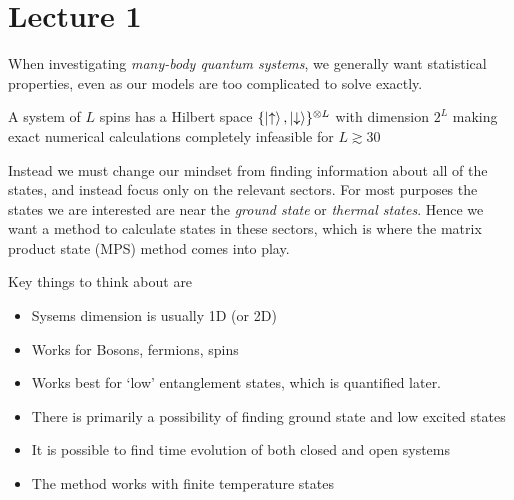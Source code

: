 \documentclass[a4paper]{article}
\author{Oscar Emil Sommer}
\begin{document}
\section{Lecture 1}
When investigating \emph{many-body quantum systems}, we generally want statistical properties,
even as our models are too complicated to solve exactly.

\begin{example}
    A system of $L$ spins has a Hilbert space
    $\{\ket{\uparrow},\ket{\downarrow}\}^{\otimes L} $ 
    with  dimension $2^L$ making exact
    numerical calculations completely infeasible for $L\gtrsim 30$
    \begin{center}
    \end{center}
    
\end{example}
Instead we must change our mindset from finding information about all of the
states, and instead focus only on the relevant sectors. For most purposes the
states we are interested are near the \emph{ground state} or \emph{thermal
states}.  Hence we want a method to calculate states in these sectors, which is
where the matrix product state (MPS) method comes into play.\\
\begin{remark} Key things to think about are
    \mbox{}
\begin{itemize}
    \item Sysems dimension is usually 1D (or 2D)
    \item Works for Bosons, fermions, spins
    \item Works best for `low' entanglement states, which is quantified later.
    \item There is primarily a possibility of finding ground state and low excited states
    \item It is possible to find time evolution of both closed and open systems
    \item The method works with finite temperature states
\end{itemize}
\end{remark}
\end{document}
